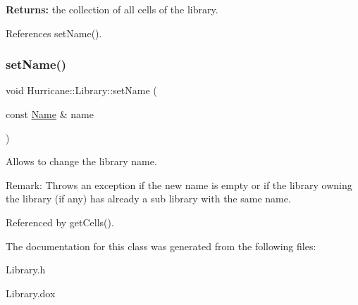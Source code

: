 {\bfseries Returns\+:} the collection of all cells of the library. 

References set\+Name().

\mbox{\label{classHurricane_1_1Library_a1181e4e87f42749bdfda253cad658ea9}} 
\subsubsection{\texorpdfstring{set\+Name()}{setName()}}
{\footnotesize\ttfamily void Hurricane\+::\+Library\+::set\+Name (\begin{DoxyParamCaption}\item[{const \hyperlink{classHurricane_1_1Name}{Name} \&}]{name }\end{DoxyParamCaption})}

Allows to change the library name.

\begin{DoxyParagraph}{Remark\+:}
Throws an exception if the new name is empty or if the library owning the library (if any) has already a sub library with the same name. 
\end{DoxyParagraph}


Referenced by get\+Cells().



The documentation for this class was generated from the following files\+:\begin{DoxyCompactItemize}
\item 
Library.\+h\item 
Library.\+dox\end{DoxyCompactItemize}
